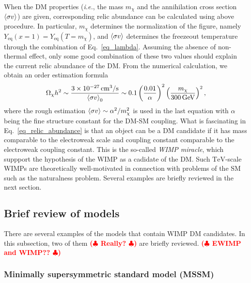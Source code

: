 \documentclass[12pt,twoside,book]{article}
\def\rem#1{ {\bf\textcolor{red}{($\clubsuit$ #1 $\clubsuit$)}}}
\begin{document}
When the DM properties (\textit{i.e.}, the mass $m_\chi$ and the
annihilation cross section $\Braket{\sigma v}$) are given,
corresponding relic abundance can be calculated using above procedure.
In particular, $m_\chi$ determines the normalization of the figure,
namely $Y_{\mathrm{eq}} (x=1) = Y_{\mathrm{eq}} (T=m_\chi)$, and
$\Braket{\sigma v}$ determines the freezeout temperature through the
combination of Eq.~\eqref{eq_lambda}.  Assuming the absence of
non-thermal effect, only some good combination of these two values
should explain the current relic abundance of the DM.  From the
numerical calculation, we obtain an order estimation formula
\begin{align}
 \Omega_\chi h^2 \sim \frac{3 \times 10^{-27}\,\mathrm{cm^3}/\mathrm{s}}
 {\Braket{\sigma v}_0} \sim
 0.1 \left( \frac{0.01}{\alpha} \right)^2
 \left( \frac{m_\chi}{300\,\mathrm{GeV}} \right)^2,\label{eq_relic_abundance}
\end{align}
where the rough estimation $\Braket{\sigma v} \sim \alpha^2/m_\chi^2$
is used in the last equation with $\alpha$ being the fine structure
constant for the DM-SM coupling.  What is fascinating in
Eq.~\eqref{eq_relic_abundance} is that an object can be a DM candidate
if it has mass comparable to the electroweak scale and coupling
constant comparable to the electroweak coupling constant.  This is the
so-called \textit{WIMP miracle}, which suppport the hypothesis of the
WIMP as a cadidate of the DM.  Such $\mathrm{TeV}$-scale WIMPs are
theoretically well-motivated in connection with problems of the SM
such as the naturalness problem.  Several examples are briefly
reviewed in the next section.

\subsection{Brief review of models}
\label{sec:mssm}

There are several examples of the models that contain WIMP DM
candidates.  In this subsection, two of them \rem{Really?} are briefly
reviewed.  \rem{EWIMP and WIMP??}

\subsubsection*{Minimally supersymmetric standard model (MSSM)}
\end{document}
